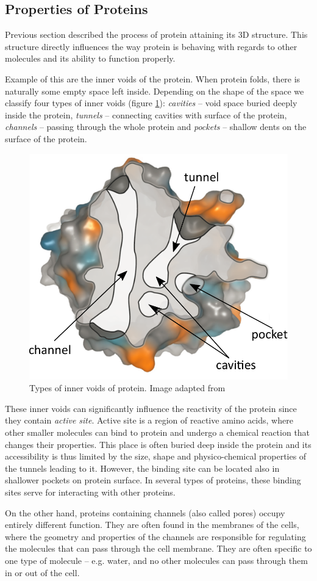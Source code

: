 \subsection{Properties of Proteins}
Previous section described the process of protein attaining its 3D structure. This structure directly influences the way protein is behaving with regards to other molecules and its ability to function properly.

Example of this are the inner voids of the protein. When protein folds, there is naturally some empty space left inside. Depending on the shape of the space we classify four types of inner voids (figure \ref{Fig:voids}): \textit{cavities} -- void space buried deeply inside the protein,  \textit{tunnels} -- connecting cavities with surface of the protein, \textit{channels} -- passing through the whole protein and \textit{pockets} -- shallow dents on the surface of the protein.

\begin{figure}[H]
  \centering
  \includegraphics[width=.45\textwidth]{pictures/Voids.pdf} 
  \caption{Types of inner voids of protein. Image adapted from \cite{Strnad2014Thesis}}
  \label{Fig:voids}
\end{figure}

These inner voids can significantly influence the reactivity of the protein since they contain \textit{active site}. Active site is a region of reactive amino acids, where other smaller molecules can bind to protein and undergo a chemical reaction that changes their properties. This place is often buried deep inside the protein and its accessibility is thus limited by the size, shape and physico-chemical properties of the tunnels leading to it. However, the binding site can be located also in shallower pockets on protein surface. In several types of proteins, these binding sites serve for interacting with other proteins.

On the other hand, proteins containing channels (also called pores) occupy entirely different function. They are often found in the membranes of the cells, where the geometry and properties of the channels are responsible for regulating the molecules that can pass through the cell membrane. They are often specific to one type of molecule -- e.g. water, and no other molecules can pass through them in or out of the cell.


